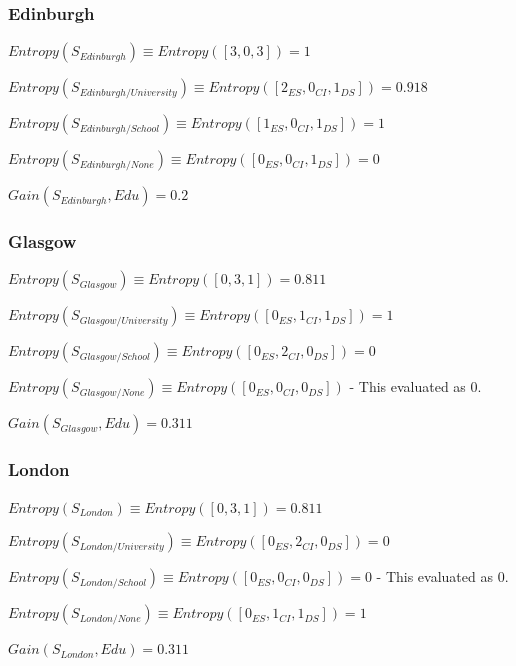 \documentclass[8pt]{article}
\begin{document}
      \subsubsection{Edinburgh}
         $Entropy(S_{Edinburgh}) \equiv Entropy([3,0,3])=1$

        \begin{description}
          \setlength{\itemsep}{1pt}
          \setlength{\parskip}{0pt}
          \setlength{\parsep}{0pt}
          \item[]$Entropy(S_{Edinburgh/University})\equiv Entropy([2_{ES},0_{CI},1_{DS}]) = 0.918$
          \item[]$Entropy(S_{Edinburgh/School})\equiv Entropy([1_{ES},0_{CI},1_{DS}]) = 1$
          \item[]$Entropy(S_{Edinburgh/None})\equiv Entropy([0_{ES},0_{CI},1_{DS}]) = 0$
          \item[]$Gain(S_{Edinburgh},Edu)= 0.2$
        \end{description}


      \subsubsection{Glasgow}
        $Entropy(S_{Glasgow}) \equiv Entropy([0,3,1])=0.811$
   
        \begin{description}
          \setlength{\itemsep}{1pt}
          \setlength{\parskip}{0pt}
          \setlength{\parsep}{0pt}
          \item[]$Entropy(S_{Glasgow/University})\equiv Entropy([0_{ES},1_{CI},1_{DS}]) = 1$
          \item[]$Entropy(S_{Glasgow/School})\equiv Entropy([0_{ES},2_{CI},0_{DS}]) = 0$
          \item[]$Entropy(S_{Glasgow/None})\equiv Entropy([0_{ES},0_{CI},0_{DS}])$ - This evaluated as 0.
          \item[]$Gain(S_{Glasgow},Edu)= 0.311$
        \end{description}

      \subsubsection{London}

        $Entropy(S_{London}) \equiv Entropy([0,3,1])=0.811$

        \begin{description}
          \setlength{\itemsep}{1pt}
          \setlength{\parskip}{0pt}
          \setlength{\parsep}{0pt}
          \item[]$Entropy(S_{London/University})\equiv Entropy([0_{ES},2_{CI},0_{DS}]) = 0$
          \item[]$Entropy(S_{London/School})\equiv Entropy([0_{ES},0_{CI},0_{DS}]) = 0$ - This evaluated as 0.
          \item[]$Entropy(S_{London/None})\equiv Entropy([0_{ES},1_{CI},1_{DS}]) = 1$
          \item[]$Gain(S_{London},Edu)= 0.311$
        \end{description}
\end{document}
